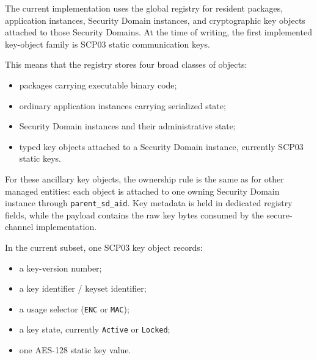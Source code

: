 The current implementation uses the global registry for resident packages,
application instances, Security Domain instances, and cryptographic key
objects attached to those Security Domains. At the time of writing, the first
implemented key-object family is SCP03 static communication keys.

This means that the registry stores four broad classes of objects:
\begin{itemize}
\item packages carrying executable binary code;
\item ordinary application instances carrying serialized state;
\item Security Domain instances and their administrative state;
\item typed key objects attached to a Security Domain instance, currently
      SCP03 static keys.
\end{itemize}

For these ancillary key objects, the ownership rule is the same as for other
managed entities: each object is attached to one owning Security Domain
instance through \texttt{parent\_sd\_aid}. Key metadata is held in dedicated
registry fields, while the payload contains the raw key bytes consumed by the
secure-channel implementation.

In the current subset, one SCP03 key object records:
\begin{itemize}
\item a key-version number;
\item a key identifier / keyset identifier;
\item a usage selector (\texttt{ENC} or \texttt{MAC});
\item a key state, currently \texttt{Active} or \texttt{Locked};
\item one AES-128 static key value.
\end{itemize}

